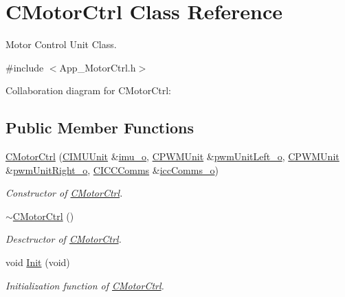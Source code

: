 \hypertarget{class_c_motor_ctrl}{}\section{C\+Motor\+Ctrl Class Reference}
\label{class_c_motor_ctrl}


Motor Control Unit Class.  




{\ttfamily \#include $<$App\+\_\+\+Motor\+Ctrl.\+h$>$}



Collaboration diagram for C\+Motor\+Ctrl\+:
\subsection*{Public Member Functions}
\begin{DoxyCompactItemize}
\item 
\mbox{\hyperlink{class_c_motor_ctrl_aa0093ebb4e0da5e22f829f717762a487}{C\+Motor\+Ctrl}} (\mbox{\hyperlink{class_c_i_m_u_unit}{C\+I\+M\+U\+Unit}} \&\mbox{\hyperlink{_a_d_a_s___m_c_u_8ino_ae51e36f83228f859afeb8a72e60339a6}{imu\+\_\+o}}, \mbox{\hyperlink{class_c_p_w_m_unit}{C\+P\+W\+M\+Unit}} \&\mbox{\hyperlink{_a_d_a_s___m_c_u_8ino_a10a570a59ef56c08699c4fec61d47d16}{pwm\+Unit\+Left\+\_\+o}}, \mbox{\hyperlink{class_c_p_w_m_unit}{C\+P\+W\+M\+Unit}} \&\mbox{\hyperlink{_a_d_a_s___m_c_u_8ino_a49af1ef8724d9cb785e37641bb0cdc6b}{pwm\+Unit\+Right\+\_\+o}}, \mbox{\hyperlink{class_c_i_c_c_comms}{C\+I\+C\+C\+Comms}} \&\mbox{\hyperlink{_a_d_a_s___m_c_u_8ino_a62ef6b3308259edb69af585549178324}{icc\+Comms\+\_\+o}})
\begin{DoxyCompactList}\small\item\em Constructor of \mbox{\hyperlink{class_c_motor_ctrl}{C\+Motor\+Ctrl}}. \end{DoxyCompactList}\item 
\mbox{\hyperlink{class_c_motor_ctrl_a97e5fbdf11c6562a7895cf4079003132}{$\sim$\+C\+Motor\+Ctrl}} ()
\begin{DoxyCompactList}\small\item\em Desctructor of \mbox{\hyperlink{class_c_motor_ctrl}{C\+Motor\+Ctrl}}. \end{DoxyCompactList}\item 
void \mbox{\hyperlink{class_c_motor_ctrl_af4b1bec8e07e766aa2537d966f025e7a}{Init}} (void)
\begin{DoxyCompactList}\small\item\em Initialization function of \mbox{\hyperlink{class_c_motor_ctrl}{C\+Motor\+Ctrl}}. \end{DoxyCompactList}\item 

\end{DoxyCompactItemize}
